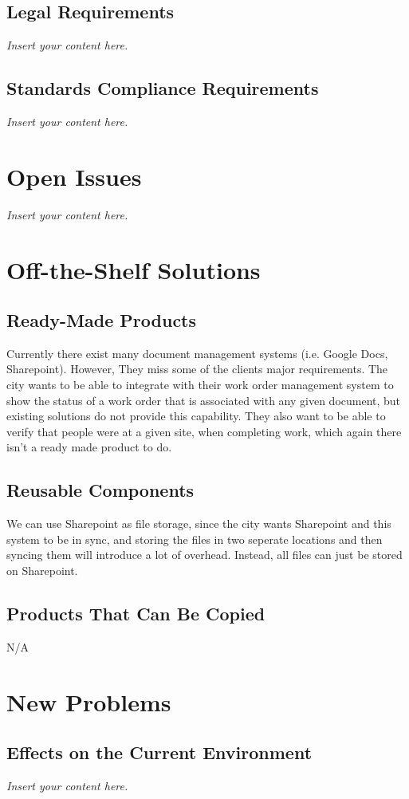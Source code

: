 \documentclass[12pt]{article}
\newcommand{\lips}{\textit{Insert your content here.}}
\begin{document}
\subsection{Legal Requirements}
\lips
\subsection{Standards Compliance Requirements}
\lips

\section{Open Issues}
\lips

\section{Off-the-Shelf Solutions}
\subsection{Ready-Made Products}
Currently there exist many document management systems (i.e. Google Docs,
Sharepoint). However, They miss some of the clients major requirements. The
city wants to be able to integrate with their work order management system to
show the status of a work order that is associated with any given document,
but existing solutions do not provide this capability. They also want to be
able to verify that people were at a given site, when completing work, which
again there isn't a ready made product to do.
\subsection{Reusable Components}
We can use Sharepoint as file storage, since the city wants Sharepoint and this
system to be in sync, and storing the files in two seperate locations and then
syncing them will introduce a lot of overhead. Instead, all files can just be
stored on Sharepoint.
\subsection{Products That Can Be Copied}
N/A

\section{New Problems}
\subsection{Effects on the Current Environment}
\lips
\end{document}
